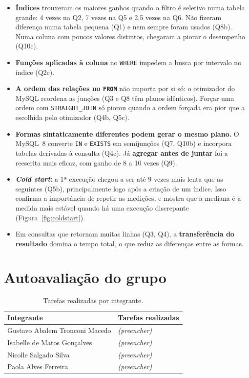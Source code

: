 \documentclass[10pt,a4paper]{article}
\begin{document}
\begin{itemize}
  \item \textbf{Índices} trouxeram os maiores ganhos quando o filtro é seletivo numa tabela grande: 4 vezes na Q2, 7 vezes na Q5 e 2,5 vezes na Q6. Não fizeram diferença numa tabela pequena (Q1) e nem sempre foram usados (Q8b). Numa coluna com poucos valores distintos, chegaram a piorar o desempenho (Q10c).
  \item \textbf{Funções aplicadas à coluna} no \texttt{WHERE} impedem a busca por intervalo no índice (Q2c).
  \item \textbf{A ordem das relações no \texttt{FROM}} não importa por si só: o otimizador do MySQL reordena as junções (Q3 e Q8 têm planos idênticos). Forçar uma ordem com \texttt{STRAIGHT\_JOIN} só piorou quando a ordem forçada era pior que a escolhida pelo otimizador (Q4b, Q5c).
  \item \textbf{Formas sintaticamente diferentes podem gerar o mesmo plano.} O MySQL~8 converte \texttt{IN} e \texttt{EXISTS} em semijunções (Q7, Q10b) e incorpora tabelas derivadas à consulta (Q4c). Já \textbf{agregar antes de juntar} foi a reescrita mais eficaz, com ganho de 8 a 10 vezes (Q9).
  \item \textbf{\emph{Cold start}:} a 1ª execução chegou a ser até 9 vezes mais lenta que as seguintes (Q5b), principalmente logo após a criação de um índice. Isso confirma a importância de repetir as medições, e mostra que a mediana é a medida mais estável quando há uma execução discrepante (Figura~\ref{fig:coldstart}).
  \item Em consultas que retornam muitas linhas (Q3, Q4), a \textbf{transferência do resultado} domina o tempo total, o que reduz as diferenças entre as formas.
\end{itemize}



\section{Autoavaliação do grupo}\label{sec:autoavaliacao}

\begin{table}[H]
\centering\small
\caption{Tarefas realizadas por integrante.}\label{tab:autoavaliacao}
\begin{tabularx}{\textwidth}{lX}
\toprule
Integrante & Tarefas realizadas \\
\midrule
Gustavo Abalem Tronconi Macedo & \textit{(preencher)} \\
Isabelle de Matos Gonçalves & \textit{(preencher)} \\
Nicolle Salgado Silva & \textit{(preencher)} \\
Paola Alves Ferreira & \textit{(preencher)} \\
\bottomrule
\end{tabularx}
\end{table}
\end{document}
